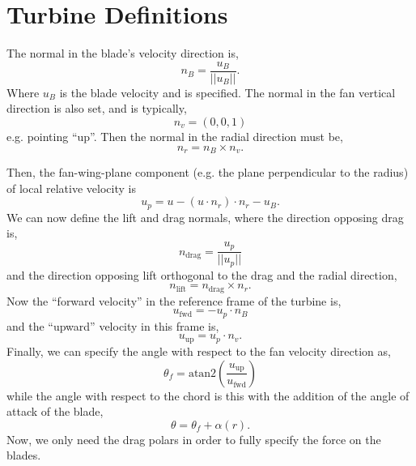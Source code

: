\section{Turbine Definitions}

The normal in the blade's velocity direction is, 
\begin{equation}
n_B = \frac{u_B}{||u_B||}. 
\end{equation}
Where $u_B$ is the blade velocity and is specified.
The normal in the fan vertical direction is also set, and is typically, 
\begin{equation}
n_v = \left(0,0,1\right)
\end{equation}
e.g. pointing ``up''. Then the normal in the radial direction must be, 
\begin{equation}
n_r = n_B \times n_v. 
\end{equation}

Then, the fan-wing-plane component (e.g. the plane perpendicular to the 
radius) of local relative velocity is
\begin{equation}
u_p = u - (u\cdot n_r)\cdot n_r - u_B. 
\end{equation}
We can now define the lift and drag normals, where the direction
opposing drag is, 
\begin{equation}
n_{\text{drag}} = \frac{u_p}{||u_p||} 
\end{equation}
and the direction opposing lift orthogonal to the drag and the radial direction, 
\begin{equation}
n_{\text{lift}}= n_{\text{drag}} \times n_r. 
\end{equation}
Now the ``forward velocity'' in the reference frame of the turbine is, 
\begin{equation}
u_{\text{fwd}}= -u_p \cdot n_B
\end{equation}
and the ``upward'' velocity in this frame is, 
\begin{equation}
u_{\text{up}} = u_p \cdot n_v. 
\end{equation}
Finally, we can specify the angle with respect to the fan velocity
direction as, 
\begin{equation}
 \theta_f = \text{atan2}\left(\frac{u_{\text{up}}}{u_{\text{fwd}}}\right)
\end{equation}
while the angle with respect to the chord is this with the addition of
the angle of attack of the blade, 
\begin{equation}
 \theta = \theta_f + \alpha(r).
\end{equation}
Now, we only need the drag polars in order to fully specify the force
on the blades.

